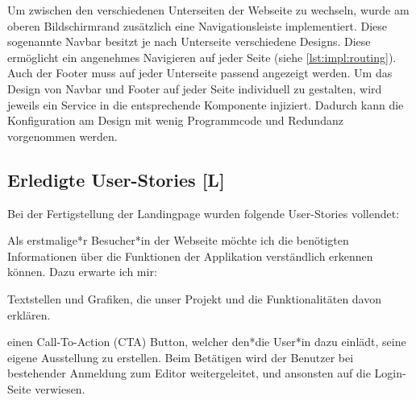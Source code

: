 Um zwischen den verschiedenen Unterseiten der Webseite zu wechseln, wurde am oberen Bildschirmrand zusätzlich eine Navigationsleiste implementiert. Diese sogenannte Navbar besitzt je nach Unterseite verschiedene Designs. Diese ermöglicht ein angenehmes Navigieren auf jeder Seite (siehe \ref{lst:impl:routing}). Auch der Footer muss auf jeder Unterseite passend angezeigt werden. Um das Design von Navbar und Footer auf jeder Seite individuell zu gestalten, wird jeweils ein Service  in die entsprechende Komponente injiziert. Dadurch kann die Konfiguration am Design mit wenig Programmcode und Redundanz vorgenommen werden.

\subsection{Erledigte User-Stories [L]}
\label{Finished Landingpage}
Bei der Fertigstellung der Landingpage wurden folgende User-Stories vollendet: 
\begin{compactitem}
    \item Als erstmalige*r Besucher*in der Webseite möchte ich die benötigten Informationen über die Funktionen der Applikation verständlich erkennen können. Dazu erwarte ich mir: 
    \begin{compactitem}
        \item Textstellen und Grafiken, die unser Projekt und die Funktionalitäten davon erklären.
        \item einen Call-To-Action (CTA) Button, welcher den*die User*in dazu einlädt, seine eigene Ausstellung zu erstellen. Beim Betätigen wird der Benutzer bei bestehender Anmeldung zum Editor weitergeleitet, und ansonsten auf die Login-Seite verwiesen.
    \end{compactitem}
\end{compactitem}

